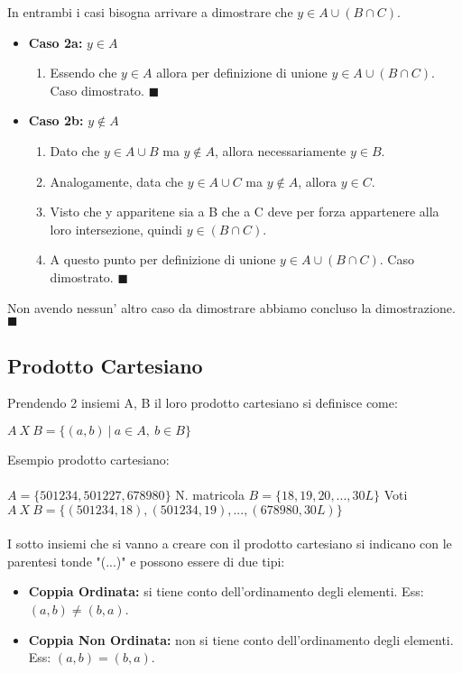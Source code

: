 In entrambi i casi bisogna arrivare a dimostrare che $y \in A \cup (B \cap C)$.
\begin{itemize}
    \item \textbf{Caso 2a:} $y \in A$
    \begin{enumerate}
        \item Essendo che $y \in A$ allora per definizione di unione $y \in A \cup (B \cap C)$. Caso dimostrato. $\blacksquare$
    \end{enumerate}
    \item \textbf{Caso 2b:} $y \notin A$
    \begin{enumerate}
        \item Dato che $y \in A \cup B$ ma $y \notin A$, allora necessariamente $y \in B$.
        \item Analogamente, data che $y \in A \cup C$ ma $y \notin A$, allora $y \in C$.
        \item Visto che y apparitene sia a B che a C deve per forza appartenere alla loro intersezione, quindi $y \in (B \cap C)$.
        \item A questo punto per definizione di unione $y \in A \cup (B \cap C)$. Caso dimostrato. $\blacksquare$
    \end{enumerate}
\end{itemize}
Non avendo nessun' altro caso da dimostrare abbiamo concluso la dimostrazione. $\blacksquare$

\subsection{Prodotto Cartesiano}
Prendendo 2 insiemi A, B il loro prodotto cartesiano si definisce come:
\begin{center}
    $A \: X \: B = \{(a, b) \: | \: a \in A, \: b \in B\}$
\end{center}
\begin{example}
    Esempio prodotto cartesiano:\\\\
    $A = \{501234, 501227, 678980\}$ N. matricola \hspace{1cm}
    $B = \{18, 19, 20, ..., 30L\}$ Voti \\
    $A \: X \: B = \{(501234, 18), (501234, 19), ..., (678980, 30L)\}$\\ \\
    I sotto insiemi che si vanno a creare con il prodotto cartesiano si indicano con le parentesi tonde "(...)" e possono essere di due tipi:
    \begin{itemize}
        \item \textbf{Coppia Ordinata:} si tiene conto dell'ordinamento degli elementi. Ess: $(a, b) \neq (b, a)$.
        \item \textbf{Coppia Non Ordinata:} non si tiene conto dell'ordinamento degli elementi. Ess: $(a, b) = (b, a)$.
\end{itemize}
\end{example}

